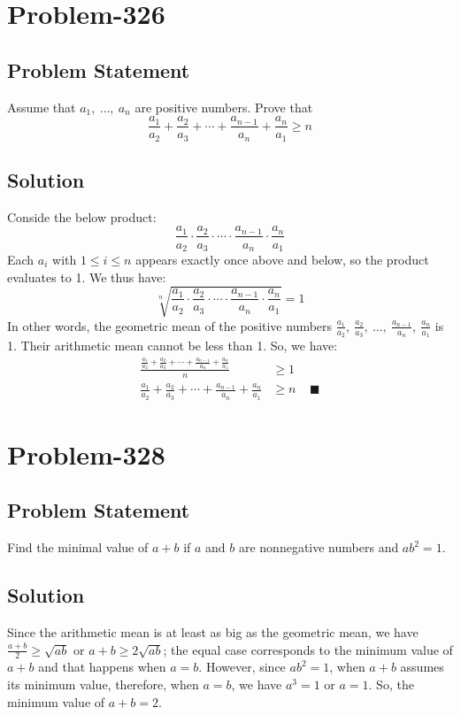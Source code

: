 \documentclass{article}
\begin{document}
\section*{Problem-326}
\subsection*{Problem Statement}
Assume that $a_1,\ \ldots,\ a_n$ are positive numbers. Prove that
\[
	\frac{a_1}{a_2} + \frac{a_2}{a_3} + \cdots + \frac{a_{n-1}}{a_n} + \frac{a_n}{a_1} \geq n
\]

\subsection*{Solution}
Conside the below product:
\[
	\frac{a_1}{a_2} \cdot \frac{a_2}{a_3} \cdot \cdots \cdot \frac{a_{n-1}}{a_n} \cdot \frac{a_n}{a_1}
\]
Each $a_i$ with $1 \leq i \leq n$ appears exactly once above and below, so the product evaluates to 1. We thus have:
\[
	\sqrt[n]{\frac{a_1}{a_2} \cdot \frac{a_2}{a_3} \cdot \cdots \cdot \frac{a_{n-1}}{a_n} \cdot \frac{a_n}{a_1}} = 1
\]
In other words, the geometric mean of the positive numbers $\frac{a_1}{a_2},\ \frac{a_2}{a_3},\ \ldots,\ \frac{a_{n-1}}{a_n},\ \frac{a_n}{a_1}$ is 1. Their arithmetic mean cannot be less than 1. So, we have:
\begin{equation*}
	\begin{aligned}
		\frac{\frac{a_1}{a_2} + \frac{a_2}{a_3} + \cdots + \frac{a_{n-1}}{a_n} + \frac{a_n}{a_1}}{n} &\geq 1\\
		\frac{a_1}{a_2} + \frac{a_2}{a_3} + \cdots + \frac{a_{n-1}}{a_n} + \frac{a_n}{a_1} &\geq n\ \ \ \ \ \blacksquare
	\end{aligned}
\end{equation*}

\section*{Problem-328}
\subsection*{Problem Statement}
Find the minimal value of $a+b$ if $a$ and $b$ are nonnegative numbers and $ab^2 = 1$.

\subsection*{Solution}
Since the arithmetic mean is at least as big as the geometric mean, we have $\frac{a+b}{2} \geq \sqrt{ab}$ or $a+b \geq 2\sqrt{ab}$; the equal case corresponds to the minimum value of $a+b$ and that happens when $a=b$. However, since $ab^2 = 1$, when $a+b$ assumes its minimum value, therefore, when $a=b$, we have $a^3=1$ or $a=1$. So, the minimum value of $a+b = 2$.
\end{document}
